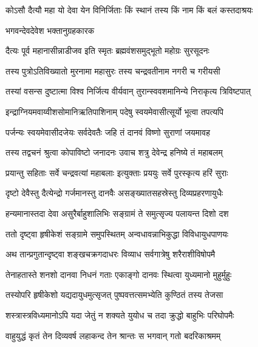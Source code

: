 
\twolineshloka
{कोऽसौ दैत्यौ महा यो देवा येन विनिर्जिताः}
{किं स्थानं तस्य किं नाम किं बलं कस्तदाश्रयः} %



\onelineshloka
{भगवन्देवदेवेश भक्तानुग्रहकारक} %

\twolineshloka
{दैत्यः पूर्व महानासीन्नाडीजव इति स्मृतः}
{ब्रह्मवंशसमुद्भूतो महोग्रः सुरसूदनः} %

\twolineshloka
{तस्य पुत्रोऽतिविख्यातो मुरनामा महासुरः}
{तस्य चन्द्रवतीनाम नगरी च गरीयसी} %

\twolineshloka
{तस्यां वसन्स दुष्टात्मा विश्व निर्जित्य वीर्यवान्}
{तुरान्स्ववशमानिन्ये निराकृत्य त्रिविष्टपात्} %

\twolineshloka
{इन्द्राग्नियमवाय्वीशसोमानिऋतिपाशिनाम्}
{पदेषु स्वयमेवासीत्सूर्यो भूत्वा तपत्यपि} %

\twolineshloka
{पर्जन्यः स्वयमेवासीदजेयः सर्वदेवतैः}
{जहि तं दानवं विष्णो सुराणां जयमावह} %

\twolineshloka
{तस्य तद्वचनं श्रुत्वा कोपाविष्टो जनादनः}
{उवाच शत्रु देवेन्द्र हनिष्ये तं महाबलम्} %

\twolineshloka
{प्रयान्तु सहिताः सर्वे चन्द्रवत्यां महाबलाः}
{इत्युक्ताः प्रययुः सर्वे पुरस्कृत्य हरिं सुराः} %

\twolineshloka
{दृष्टो देवैस्तु दैत्येन्द्रो गर्जमानस्तु दानवैः}
{असङ्ख्यातसहस्रेस्तु दिव्यप्रहरणायुधैः} %

\twolineshloka
{हन्यमानास्तदा देवा असुरैर्बाहुशालिभिः}
{सङ्ग्रामं ते समुत्सृज्य पलायन्त दिशो दश} %

\twolineshloka
{ततो दृष्ट्वा हृषीकेशं सङ्ग्रामे समुपस्थितम्}
{अन्वधावन्नाभिकुद्धा विविधायुधपाणयः} %

\twolineshloka
{अथ तान्प्रगुतान्दृष्ट्वा शङ्खचक्रगदाधरः}
{विव्याध सर्वगात्रेषु शरैराशीविषोपमै} %

\twolineshloka
{तेनाहतास्ते शनशो दानवा निधनं गताः}
{एकाङ्गो दानवः स्थित्वा युध्यमानो मुहुर्मुहुः} %

\twolineshloka
{तस्योपरि हृषीकेशो यद्यदायुधमुत्सृजत्}
{पुष्पवत्तत्समभ्येति कुण्ठितं तस्य तेजसा} %

\twolineshloka
{शस्त्रास्त्रविध्यमानोऽपि यदा जेतुं न शक्यते}
{युयोध च तदा क्रुद्धो बाहुभिः परिघोपमैः} %

\twolineshloka
{वाहुयुद्धं कृतं तेन दिव्यवर्ष लहाकन्द}
{तेन श्रान्तः स भगवान् गतो बदरिकाश्रमम्} %


